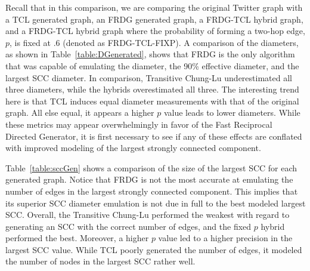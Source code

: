 \documentclass[pdftex,11pt,a4paper,twocolumn]{scrartcl}
\begin{document}
Recall that in this comparison, we are comparing the original Twitter graph with a TCL generated graph, an FRDG generated graph, a FRDG-TCL hybrid graph, and a FRDG-TCL hybrid graph where the probability of forming a two-hop edge, $p$, is fixed at $.6$ (denoted as FRDG-TCL-FIXP). A comparison of the diameters, as shown in Table~\ref{table:DGenerated}, shows that FRDG is the only algorithm that was capable of emulating the diameter, the 90\% effective diameter, and the largest SCC diameter. In comparison, Transitive Chung-Lu underestimated all three diameters, while the hybrids overestimated all three. The interesting trend here is that TCL induces equal diameter measurements with that of the original graph. All else equal, it appears a higher $p$ value leads to lower diameters. While these metrics may appear overwhelmingly in favor of the Fast Reciprocal Directed Generator, it is first necessary to see if any of these effects are conflated with improved modeling of the largest strongly connected component. 

\begin{table}[h]
\centering
{}
\caption{Diameters of Generated Graphs}
\label{table:DGenerated}
\end{table}

Table~\ref{table:sccGen} shows a comparison of the size of the largest SCC for each generated graph. Notice that FRDG is not the most accurate at emulating the number of edges in the largest strongly connected component. This implies that its superior SCC diameter emulation is not due in full to the best modeled largest SCC. Overall, the Transitive Chung-Lu performed the weakest with regard to generating an SCC with the correct number of edges, and the fixed $p$ hybrid performed the best. Moreover, a higher $p$ value led to a higher precision in the largest SCC value. While TCL poorly generated the number of edges, it modeled the number of nodes in the largest SCC rather well.  
\end{document}
